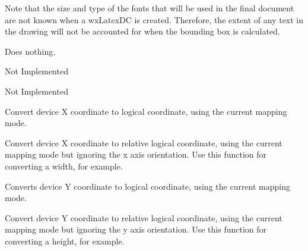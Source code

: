 Note that the size and type of the fonts that will be used in the final
document are not known when a wxLatexDC is created. Therefore, the extent
of any text in the drawing will not be accounted for when the bounding
box is calculated.
 
\label{wxlatexdcclear}


Does nothing.


\label{wxlatexdccrosshair}


Not Implemented

\label{wxlatexdcdestroyclippingregion}


Not Implemented

\label{wxlatexdcdevicetologicalx}


Convert device X coordinate to logical coordinate, using the current
mapping mode.

\label{wxlatexdcdevicetologicalxrel}


Convert device X coordinate to relative logical coordinate, using the current
mapping mode but ignoring the x axis orientation.
Use this function for converting a width, for example.

\label{wxlatexdcdevicetologicaly}


Converts device Y coordinate to logical coordinate, using the current
mapping mode.

\label{wxlatexdcdevicetologicalyrel}


Convert device Y coordinate to relative logical coordinate, using the current
mapping mode but ignoring the y axis orientation.
Use this function for converting a height, for example.

